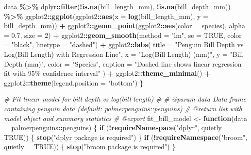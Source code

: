\documentclass[
]{article}
\newenvironment{Shaded}{\begin{snugshade}}{\end{snugshade}}
\newcommand{\AttributeTok}[1]{\textcolor[rgb]{0.13,0.29,0.53}{#1}}
\newcommand{\CommentTok}[1]{\textcolor[rgb]{0.56,0.35,0.01}{\textit{#1}}}
\newcommand{\ConstantTok}[1]{\textcolor[rgb]{0.56,0.35,0.01}{#1}}
\newcommand{\ControlFlowTok}[1]{\textcolor[rgb]{0.13,0.29,0.53}{\textbf{#1}}}
\newcommand{\DecValTok}[1]{\textcolor[rgb]{0.00,0.00,0.81}{#1}}
\newcommand{\FloatTok}[1]{\textcolor[rgb]{0.00,0.00,0.81}{#1}}
\newcommand{\FunctionTok}[1]{\textcolor[rgb]{0.13,0.29,0.53}{\textbf{#1}}}
\newcommand{\NormalTok}[1]{#1}
\newcommand{\OtherTok}[1]{\textcolor[rgb]{0.56,0.35,0.01}{#1}}
\newcommand{\SpecialCharTok}[1]{\textcolor[rgb]{0.81,0.36,0.00}{\textbf{#1}}}
\newcommand{\StringTok}[1]{\textcolor[rgb]{0.31,0.60,0.02}{#1}}
\begin{document}
\begin{Shaded}
\begin{Highlighting}[]
\NormalTok{  data }\SpecialCharTok{\%\textgreater{}\%}
\NormalTok{    dplyr}\SpecialCharTok{::}\FunctionTok{filter}\NormalTok{(}\SpecialCharTok{!}\FunctionTok{is.na}\NormalTok{(bill\_length\_mm), }\SpecialCharTok{!}\FunctionTok{is.na}\NormalTok{(bill\_depth\_mm)) }\SpecialCharTok{\%\textgreater{}\%}
\NormalTok{    ggplot2}\SpecialCharTok{::}\FunctionTok{ggplot}\NormalTok{(ggplot2}\SpecialCharTok{::}\FunctionTok{aes}\NormalTok{(}\AttributeTok{x =} \FunctionTok{log}\NormalTok{(bill\_length\_mm), }\AttributeTok{y =}\NormalTok{ bill\_depth\_mm)) }\SpecialCharTok{+}
\NormalTok{    ggplot2}\SpecialCharTok{::}\FunctionTok{geom\_point}\NormalTok{(ggplot2}\SpecialCharTok{::}\FunctionTok{aes}\NormalTok{(}\AttributeTok{color =}\NormalTok{ species), }\AttributeTok{alpha =} \FloatTok{0.7}\NormalTok{, }\AttributeTok{size =} \DecValTok{2}\NormalTok{) }\SpecialCharTok{+}
\NormalTok{    ggplot2}\SpecialCharTok{::}\FunctionTok{geom\_smooth}\NormalTok{(}\AttributeTok{method =} \StringTok{"lm"}\NormalTok{, }\AttributeTok{se =} \ConstantTok{TRUE}\NormalTok{, }\AttributeTok{color =} \StringTok{"black"}\NormalTok{, }\AttributeTok{linetype =} \StringTok{"dashed"}\NormalTok{) }\SpecialCharTok{+}
\NormalTok{    ggplot2}\SpecialCharTok{::}\FunctionTok{labs}\NormalTok{(}
      \AttributeTok{title =} \StringTok{"Penguin Bill Depth vs Log(Bill Length) with Regression Line"}\NormalTok{,}
      \AttributeTok{x =} \StringTok{"Log(Bill Length) (mm)"}\NormalTok{,}
      \AttributeTok{y =} \StringTok{"Bill Depth (mm)"}\NormalTok{,}
      \AttributeTok{color =} \StringTok{"Species"}\NormalTok{,}
      \AttributeTok{caption =} \StringTok{"Dashed line shows linear regression fit with 95\% confidence interval"}
\NormalTok{    ) }\SpecialCharTok{+}
\NormalTok{    ggplot2}\SpecialCharTok{::}\FunctionTok{theme\_minimal}\NormalTok{() }\SpecialCharTok{+}
\NormalTok{    ggplot2}\SpecialCharTok{::}\FunctionTok{theme}\NormalTok{(}\AttributeTok{legend.position =} \StringTok{"bottom"}\NormalTok{)}
\NormalTok{\}}

\CommentTok{\#\textquotesingle{} Fit linear model for bill depth vs log(bill length)}
\CommentTok{\#\textquotesingle{} }
\CommentTok{\#\textquotesingle{} @param data Data frame containing penguin data (default: palmerpenguins::penguins)}
\CommentTok{\#\textquotesingle{} @return list with model object and summary statistics}
\CommentTok{\#\textquotesingle{} @export}
\NormalTok{fit\_bill\_model }\OtherTok{\textless{}{-}} \ControlFlowTok{function}\NormalTok{(}\AttributeTok{data =}\NormalTok{ palmerpenguins}\SpecialCharTok{::}\NormalTok{penguins) \{}
  \ControlFlowTok{if}\NormalTok{ (}\SpecialCharTok{!}\FunctionTok{requireNamespace}\NormalTok{(}\StringTok{"dplyr"}\NormalTok{, }\AttributeTok{quietly =} \ConstantTok{TRUE}\NormalTok{)) \{}
    \FunctionTok{stop}\NormalTok{(}\StringTok{"dplyr package is required"}\NormalTok{)}
\NormalTok{  \}}
  \ControlFlowTok{if}\NormalTok{ (}\SpecialCharTok{!}\FunctionTok{requireNamespace}\NormalTok{(}\StringTok{"broom"}\NormalTok{, }\AttributeTok{quietly =} \ConstantTok{TRUE}\NormalTok{)) \{}
    \FunctionTok{stop}\NormalTok{(}\StringTok{"broom package is required"}\NormalTok{)}
\NormalTok{  \}}
  

\end{Highlighting}
\end{Shaded}
\end{document}
